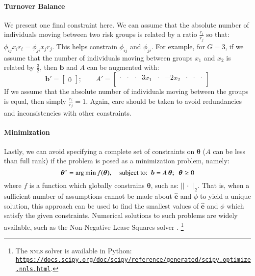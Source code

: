 \paragraph{Turnover Balance}
We present one final constraint here.
We can assume that
the absolute number of individuals moving between two risk groups is
related by a ratio $\frac{r_i}{r_j}$ so that:
$\phi_{ij} x_{i} r_{i} = \phi_{ji} x_{j} r_{j}$.
This helps constrain $\phi_{ij}$ and $\phi_{ji}$.
For example, for $G = 3$,
if we assume that the number of individuals moving between groups $x_1$ and $x_2$
is related by $\frac{3}{2}$,
then $\bm{b}$ and $A$ can be augmented with:
\begin{equation}
\bm{b}' = \left[\begin{array}{c}
0
\end{array}\right];\qquad
A' = \left[\begin{array}{ccccccccc}
\cdot & \cdot & \cdot & 3 x_1 & \cdot & -2 x_2 & \cdot & \cdot & \cdot \\
\end{array}\right] 
\end{equation}
If we assume that the absolute number of individuals moving between the groups is equal,
then simply $\frac{r_i}{r_j} = 1$.
Again, care should be taken to avoid redundancies and inconsistencies with other constraints.
\paragraph{Minimization}
Lastly, we can avoid specifying a complete set of constraints on $\bm{\theta}$
($A$ can be less than full rank)
if the problem is posed as a minimization problem, namely:
\begin{equation}\label{eq:system-optimize}
\bm{\theta}^{*} = {\arg \min}
\thinspace f(\bm{\theta}),
\quad \textrm{subject to:}
\enspace\bm{b} = A\thinspace\bm{\theta};
\enspace\bm{\theta} \ge 0
\end{equation}
where $f$ is a function which globally constrains $\bm{\theta}$,
such as: ${\left|\left| \,\cdot\, \right|\right|}_2$.
That is, when a sufficient number of assumptions cannot be made about $\bm{\hat{e}}$ and $\phi$
to yield a unique solution,
this approach can be used to find the smallest values of $\bm{\hat{e}}$ and $\phi$
which satisfy the given constraints.
Numerical solutions to such problems are widely available,
such as the Non-Negative Lease Squares solver \citep{Lawson1995}.%
\footnote{The \textsc{nnls} solver is available in Python:
   \href{https://docs.scipy.org/doc/scipy/reference/generated/scipy.optimize.nnls.html}
{\texttt{https://docs.scipy.org/doc/scipy/reference/generated/scipy.optimize.nnls.html}}.}
